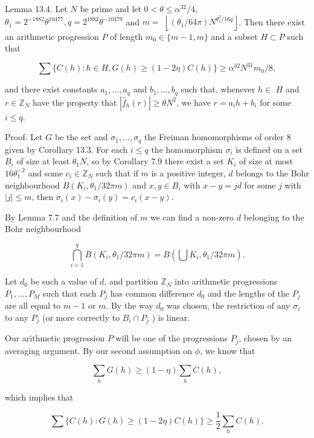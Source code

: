\documentclass[10pt]{article}
\begin{document}
Lemma 13.4. Let $N$ be prime and let $0<\theta\leqslant\alpha^{32}/4$, $\theta_{1}=2^{-1882} \theta^{10477}, q=2^{1882} \theta^{-10479}$ and $m=$ $\left\lfloor\left(\theta_{1} / 64 \pi\right) N^{\theta_{1}^{2} / 16 q}\right\rfloor$. Then there exist an arithmetic progression $P$ of length $m_{0} \in\{m-1, m\}$ and a subset $H \subset P$ such that

$$
\sum\{C(h): h \in H, G(h) \geqslant(1-2 \eta) C(h)\} \geqslant \alpha^{32} N^{31} m_{0} / 8,
$$

and there exist constants $a_{1}, \ldots, a_{q}$ and $b_{1}, \ldots, b_{q}$ such that, whenever $h \in$ $H$ and $r \in \mathbb{Z}_{N}$ have the property that $\left|\hat{f}_{h}(r)\right| \geqslant \theta N^{2}$, we have $r=a_{i} h+b_{i}$ for some $i \leqslant q$.

Proof. Let $G$ be the set and $\sigma_{1}, \ldots, \sigma_{q}$ the Freiman homomorphisms of order 8 given by Corollary 13.3. For each $i \leqslant q$ the homomorphism $\sigma_{i}$ is defined on a set $B_{i}$ of size at least $\theta_{1} N$, so by Corollary 7.9 there exist a set $K_{i}$ of size at most $16 \theta_{1}^{-2}$ and some $c_{i} \in \mathbb{Z}_{N}$ such that if $m$ is a positive integer, $d$ belongs to the Bohr neighbourhood $B\left(K_{i}, \theta_{1} / 32 \pi m\right)$ and $x, y \in B_{i}$ with $x-y=j d$ for some $j$ with $|j| \leqslant m$, then $\sigma_{i}(x)-\sigma_{i}(y)=c_{i}(x-y)$.

By Lemma 7.7 and the definition of $m$ we can find a non-zero $d$ belonging to the Bohr neighbourhood

$$
\bigcap_{i=1}^{q} B\left(K_{i}, \theta_{1} / 32 \pi m\right)=B\left(\bigcup K_{i}, \theta_{1} / 32 \pi m\right) .
$$

Let $d_{0}$ be such a value of $d$, and partition $\mathbb{Z}_{N}$ into arithmetic progressions $P_{1}, \ldots, P_{M}$ such that each $P_{j}$ has common difference $d_{0}$ and the lengths of the $P_{j}$ are all equal to $m-1$ or $m$. By the way $d_{0}$ was chosen, the restriction of any $\sigma_{i}$ to any $P_{j}$ (or more correctly to $B_{i} \cap P_{j}$ ) is linear.

Our arithmetic progression $P$ will be one of the progressions $P_{j}$, chosen by an averaging argument. By our second assumption on $\phi$, we know that

$$
\sum_{h} G(h) \geqslant(1-\eta) \sum_{h} C(h),
$$

which implies that

$$
\sum\{C(h): G(h) \geqslant(1-2 \eta) C(h)\} \geqslant \frac{1}{2} \sum_{h} C(h) .
$$
\end{document}
